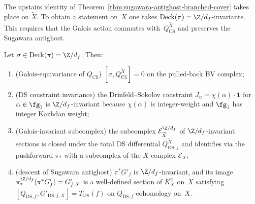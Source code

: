The upstairs identity of
Theorem~\ref{thm:sugawara-antighost-branched-cover} takes place on
$\widetilde X$. To obtain a statement on~$X$ one takes
$\mathrm{Deck}(\pi) = \Z/d_{f}$-invariants. This requires that the
Galois action commutes with~$Q_{\mathrm{CS}}^{\widetilde X}$ and
preserves the Sugawara antighost.

\begin{theorem}
\label{thm:galois-invariance-descent}
Let $\sigma \in \mathrm{Deck}(\pi) = \Z/d_{f}$. Then:
\begin{enumerate}[label=\textup{(\alph*)},nosep]
\item \textup{(Galois-equivariance of $Q_{\mathrm{CS}}$)}
 $[\sigma, Q_{\mathrm{CS}}^{\widetilde X}] = 0$ on the
 pulled-back BV complex;
\item \textup{(DS constraint invariance)} the Drinfeld--Sokolov
 constraint $J_{\alpha} = \chi(\alpha) \cdot \mathbf{1}$ for
 $\alpha \in \fg_{1}$ is $\Z/d_{f}$-invariant because
 $\chi(\alpha)$ is integer-weight and $\fg_{1}$ has integer
 Kazhdan weight;
\item \textup{(Galois-invariant subcomplex)} the subcomplex
 $\mathcal{E}^{\Z/d_{f}}_{\widetilde X}$ of $\Z/d_{f}$-invariant
 sections is closed under the total DS differential
 \(Q_{\mathrm{DS},f}^{\widetilde X}\) and identifies via the pushforward
 $\pi_{*}$ with a subcomplex of the $X$-complex $\mathcal{E}_{X}$;
\item \textup{(descent of Sugawara antighost)}
 $\pi^{*}G'_{f}$ is $\Z/d_{f}$-invariant, and its image
 $\pi_{*}^{\Z/d_{f}}(\pi^{*}G'_{f}) = G'_{f,X}$ is a
 well-defined section of $K_{X}^{2}$ on~$X$ satisfying
 $[Q_{\mathrm{DS},f}, G'_{\mathrm{DS},f,X}] = T_{\mathrm{DS}}(f)$ on
 $Q_{\mathrm{DS},f}$-cohomology on~$X$.
\end{enumerate}
\end{theorem}

